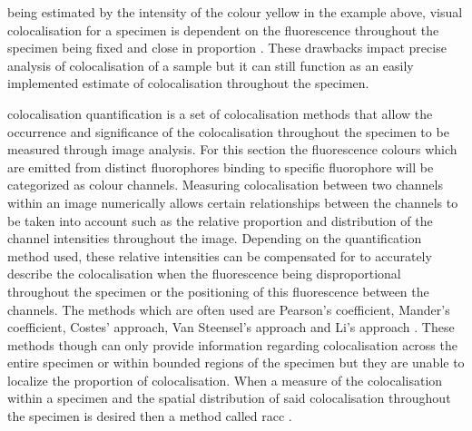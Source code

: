 being estimated by the intensity of the colour yellow in the example above, visual colocalisation for a specimen is dependent on the fluorescence throughout the specimen being fixed and close in proportion \cite{practical_guide_coloc}. These drawbacks impact precise analysis of colocalisation of a sample but it can still function as an easily implemented estimate of colocalisation throughout the specimen.\par colocalisation quantification is a set of colocalisation methods that allow the occurrence and significance of the colocalisation throughout the specimen to be measured through image analysis. For this section the fluorescence colours which are emitted from distinct fluorophores binding to specific fluorophore will be categorized as colour channels. Measuring colocalisation between two channels within an image numerically allows certain relationships between the channels to be taken into account such as the relative proportion and distribution of the channel intensities throughout the image. Depending on the quantification method used, these relative intensities can be compensated for to accurately describe the colocalisation when the fluorescence being disproportional throughout the specimen or the positioning of this fluorescence between the channels. The methods which are often used are Pearson's coefficient, Mander's coefficient, Costes' approach, Van Steensel's approach and Li's approach \cite{Bolte-2006}. These methods though can only provide information regarding colocalisation across the entire specimen or within bounded regions of the specimen but they are unable to localize the proportion of colocalisation. When a measure of the colocalisation within a specimen and the spatial distribution of said colocalisation throughout the specimen is desired then a method called \gls{racc} \cite{racc}.
